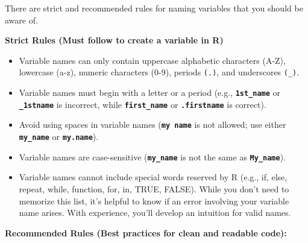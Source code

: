 \documentclass[
]{book}
\begin{document}
There are strict and recommended rules for naming variables that you should be aware of.

\textbf{Strict Rules (Must follow to create a variable in R)}

\begin{itemize}
\item
  Variable names can only contain uppercase alphabetic characters (A-Z), lowercase (a-z), numeric characters (0-9), periods \texttt{(.)}, and underscores \texttt{(\_)}.
\item
  Variable names must begin with a letter or a period (e.g., \textbf{\texttt{1st\_name}} or \textbf{\texttt{\_1stname}} is incorrect, while \textbf{\texttt{first\_name}} or \textbf{\texttt{.firstname}} is correct).
\item
  Avoid using spaces in variable names (\textbf{\texttt{my\ name}} is not allowed; use either \textbf{\texttt{my\_name}} or \textbf{\texttt{my.name}}).
\item
  Variable names are case-sensitive (\textbf{\texttt{my\_name}} is not the same as \textbf{\texttt{My\_name}}).
\item
  Variable names cannot include special words reserved by R (e.g., if, else, repeat, while, function, for, in, TRUE, FALSE). While you don't need to memorize this list, it's helpful to know if an error involving your variable name arises. With experience, you'll develop an intuition for valid names.
\end{itemize}

\textbf{Recommended Rules (Best practices for clean and readable code):}
\end{document}
